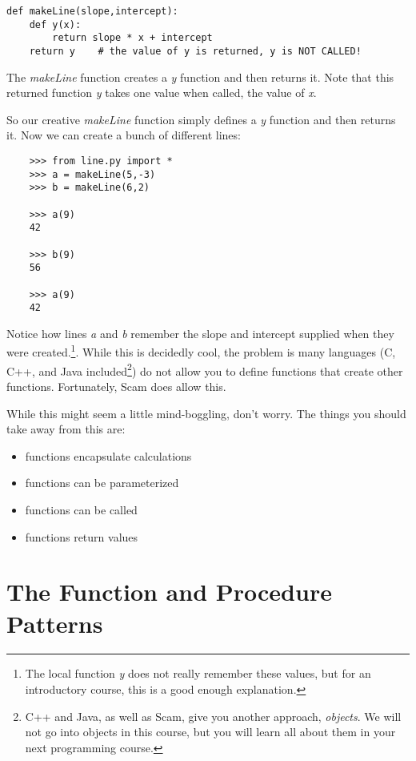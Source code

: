 \begin{verbatim}
def makeLine(slope,intercept):
    def y(x):
        return slope * x + intercept
    return y    # the value of y is returned, y is NOT CALLED!
\end{verbatim}

The {\it makeLine} function creates a {\it y} function
and then returns it. Note that this returned function {\it y} takes
one value when called, the value of {\it x}.

So our creative {\it makeLine} function
simply defines a {\it y} function and then
returns it. Now we can create a bunch of different lines:

\begin{verbatim}
    >>> from line.py import *
    >>> a = makeLine(5,-3)
    >>> b = makeLine(6,2)

    >>> a(9)
    42
    
    >>> b(9)
    56

    >>> a(9)
    42
\end{verbatim}

Notice how lines {\it a} and {\it b} remember
the slope and intercept supplied
when they were created.\footnote{
The local function {\it y} does not really remember these values,
but for an introductory course, this is a good enough explanation.}.
While this is decidedly cool, the problem is many languages (C, C++, and Java
included\footnote{
C++ and Java, as well as Scam, give you another approach, {\it objects}.
We will not go into objects in this course, but
you will learn all about them in your next programming course.})
do not allow you to define functions that create other functions.
Fortunately, Scam does allow this.

While this might seem a little mind-boggling, don't worry. The
things you should take away from this are:

\begin{itemize}
\item
    functions encapsulate calculations
\item
    functions can be parameterized
\item
    functions can be called
\item
    functions return values
\end{itemize}

\section{The Function and Procedure Patterns}

